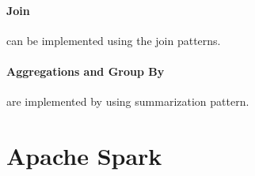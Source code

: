 \documentclass[12pt]{article}
\begin{document}
\paragraph{Join} can be implemented using the join patterns.

\paragraph{Aggregations and Group By} are implemented by using summarization pattern.

\clearpage
\section{Apache Spark}
\end{document}
